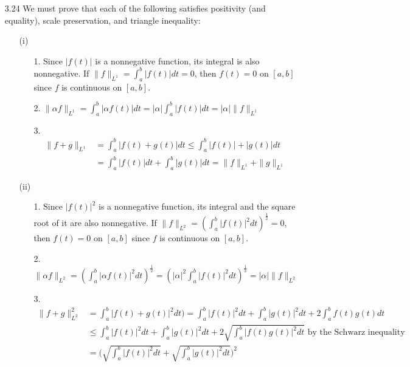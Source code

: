 \documentclass[letterpaper,12pt]{article}
\theoremstyle{definition}
\begin{document}
\begin{enumerate}
        \item[3.24]
          We must prove that each of the following satisfies positivity (and equality), scale preservation, and triangle inequality:
          \begin{enumerate}
            \item[(i)]
              \begin{enumerate}
                \item[1.]
                Since $|f(t)|$ is a nonnegative function, its integral is also nonnegative. If $\|f\|_{L^1} = \int_a^b|f(t)|dt = 0$, then $f(t)=0$ on $[a,b]$ since $f$ is continuous on $[a,b]$.
                \item[2.]
                $\|\alpha f\|_{L^1} = \int_a^b|\alpha f(t)|dt = |\alpha| \int_a^b|f(t)|dt = |\alpha| \|f\|_{L^1}$
                \item[3.]
                  \begin{align*}
                    \|f+g\|_{L^1} &= \int_a^b|f(t) + g(t)|dt \leq \int_a^b|f(t)| + |g(t)|dt \\
                    &= \int_a^b|f(t)|dt + \int_a^b|g(t)|dt = \|f\|_{L^1}+\|g\|_{L^1}
                  \end{align*}
              \end{enumerate}
            \item[(ii)]
              \begin{enumerate}
                \item[1.]
                  Since $|f(t)|^2$ is a nonnegative function, its integral and the square root of it are also nonnegative. If $\|f\|_{L^2} = (\int_a^b|f(t)|^2dt)^{\frac{1}{2}} = 0$, then $f(t)=0$ on $[a,b]$ since $f$ is continuous on $[a,b]$.
                \item[2.]
                $\|\alpha f\|_{L^2} = (\int_a^b|\alpha f(t)|^2dt)^{\frac{1}{2}} = (|\alpha|^2 \int_a^b|f(t)|^2dt)^{\frac{1}{2}} = |\alpha| \|f\|_{L^2}$
                \item[3.]
                \begin{align*}
                  \|f+g\|_{L^2}^2 &= \int_a^b|f(t) + g(t)|^2 dt) = \int_a^b|f(t)|^2dt + \int_a^b|g(t)|^2dt + 2\int_a^bf(t)g(t)dt \\
                  & \leq \int_a^b|f(t)|^2dt + \int_a^b|g(t)|^2dt + 2\sqrt{\int_a^b|f(t)g(t)|^2dt} \text{ by the Schwarz inequality} \\
                  &= \Bigg(\sqrt{\int_a^b|f(t)|^2dt} + \sqrt{\int_a^b|g(t)|^2dt} \Bigg)^2 \\

\end{align*}
\end{enumerate}
\end{enumerate}
\end{enumerate}
\end{document}
